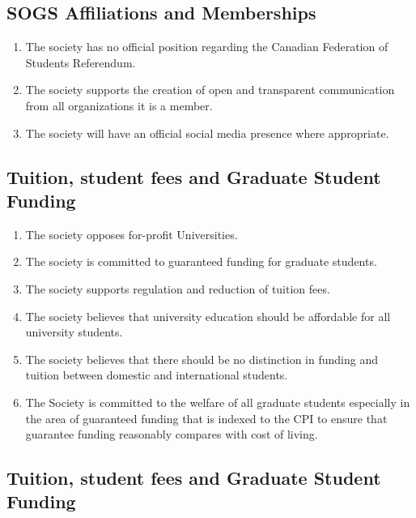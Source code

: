 \subsection{SOGS Affiliations and Memberships}
\begin{enumerate}
\item	The society has no official position regarding the Canadian Federation of Students Referendum.
\item The society supports the creation of open and transparent communication from all organizations it is a member.
\item The society will have an official social media presence where appropriate.   
\end{enumerate}

\subsection{Tuition, student fees and Graduate Student Funding}
\begin{enumerate}
\item 	The society opposes for-profit Universities. 
\item The society is committed to guaranteed funding for graduate students.
\item 	The society supports regulation and reduction of tuition fees.
\item The society believes that university education should be affordable for all university students.
\item The society believes that there should be no distinction in funding and tuition between domestic and international students.
\item The Society is committed to the welfare of all graduate students especially in the area of guaranteed funding that is indexed to the CPI to ensure that guarantee funding reasonably compares with cost of living.

\end{enumerate}


\subsection{Tuition, student fees and Graduate Student Funding}
